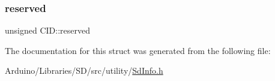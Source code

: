 \mbox{\label{struct_c_i_d_a458794d915efa88aef06f5b0612895ac}} 
\subsubsection{\texorpdfstring{reserved}{reserved}}
{\footnotesize\ttfamily unsigned C\+I\+D\+::reserved}



The documentation for this struct was generated from the following file\+:\begin{DoxyCompactItemize}
\item 
Arduino/\+Libraries/\+S\+D/src/utility/\hyperlink{_sd_info_8h}{Sd\+Info.\+h}\end{DoxyCompactItemize}
